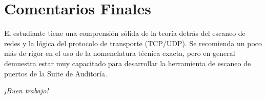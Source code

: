 \documentclass[12pt,a4paper]{article}
\begin{document}
\vspace{1cm}

\section*{Comentarios Finales}
\noindent El estudiante tiene una comprensión sólida de la teoría detrás del escaneo de redes y la lógica del protocolo de transporte (TCP/UDP). Se recomienda un poco más de rigor en el uso de la nomenclatura técnica exacta, pero en general demuestra estar muy capacitado para desarrollar la herramienta de escaneo de puertos de la Suite de Auditoría.

\vspace{0.5cm}
\begin{center}
    \textit{¡Buen trabajo!}
\end{center}
\end{document}
